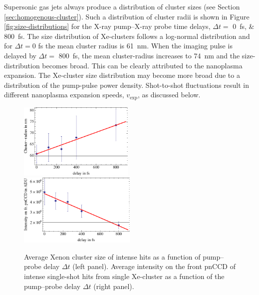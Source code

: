 Supersonic gas jets always produce a distribution of cluster sizes (see Section \ref{sec:homogenous-cluster}). Such a distribution of cluster radii is shown in Figure \ref{fig:size-distributions} for the X-ray pump--X-ray probe time delays, $\Delta t =$ \SIlist{0;800}{\femto\second}. The size distribution of Xe-clusters follows a log-normal distribution \citep{Schutte-2002-IJMS} and for $\Delta t=0$ fs the mean cluster radius is \SI{61}{\nano\meter}. When the imaging pulse is delayed by $\Delta t=$ \SI{800}{\femto\second}, the mean cluster-radius increases to \SI{74}{\nano\meter} and the size-distribution becomes broad. This can be clearly attributed to the nanoplasma expansion. The Xe-cluster size distribution may become more broad due to a distribution of the pump-pulse power density. Shot-to-shot fluctuations result in different nanoplasma expansion speeds, $v_{\text{exp}}$, as discussed below.\\[1\baselineskip]
%
\begin{figure}
	\centering
		\includegraphics[width=0.49\textwidth]{images/filter-size.pdf}
		\includegraphics[width=0.50\textwidth]{images/filter-sum-frontpnCCD.pdf}
	\caption[Average cluster size correlated to measured intensity on front pnCCD.]{Average Xenon cluster size of intense hits as a function of pump--probe delay $\Delta t$ (left panel). Average intensity on the front pnCCD of intense single-shot hits from single Xe-cluster as a function of the pump--probe delay $\Delta t$ (right panel).}
	\label{fig:filter-size-intensity}
\end{figure}
%
